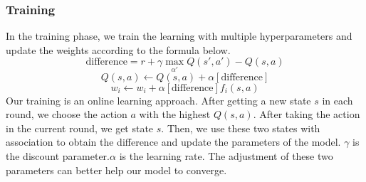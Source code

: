 \documentclass{article}
\begin{document}
    \subsubsection{Training}
        In the training phase, we train the learning with multiple hyperparameters and update the weights according to the formula below.
        \[ \mathrm{difference} = r+\gamma \mathop{\mathrm{max}}_{\alpha'}Q(s',a')-Q(s,a)\]
        \[ Q(s,a) \xleftarrow{} Q(s,a) +\alpha[\mathrm{difference}]\]
        \[w_i \xleftarrow{} w_i+\alpha[\mathrm{difference}] f_i(s,a)\]
        Our training is an online learning approach. After getting a new state $s$ in each round, we choose the action $a$ with the highest $Q(s,a)$. After taking the action in the current round, we get state $s$. Then, we use these two states with association to obtain the difference and update the parameters of the model. $\gamma$ is the discount parameter.$\alpha$ is the learning rate. The adjustment of these two parameters can better help our model to converge.
        
    
    
    
    
    
\end{document}
